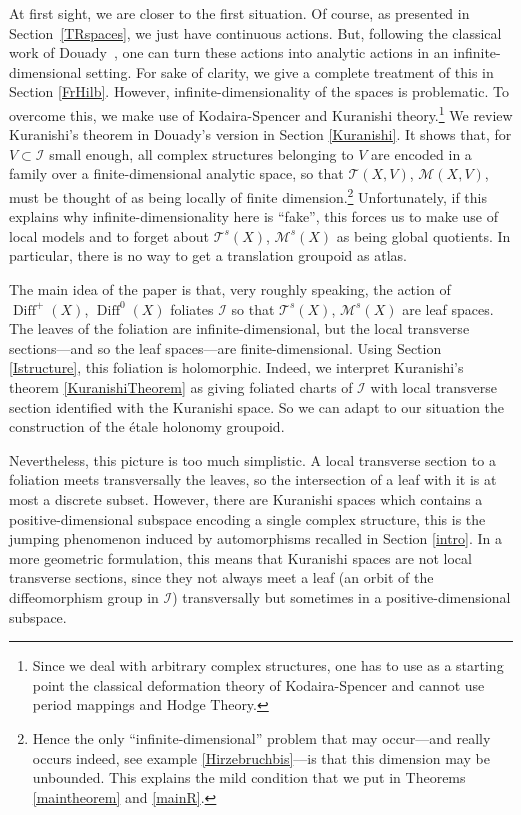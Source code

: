 \documentclass[10pt]{amsart}
\let\mathcal\mathscr
\DeclareMathOperator{\Diff}{Diff}
\theoremstyle{plain}
\theoremstyle{definition}
\theoremstyle{remark}
\numberwithin{equation}{section}
\newcommand{\cI}{\mathcal{I}}
\begin{document}
At first sight, we are closer to the first situation. Of course, as presented in Section~\ref{TRspaces}, we just have continuous actions. But, following the classical work of Douady~\cite{Douady}, one can turn these actions into analytic actions in an infinite-dimensional setting. For sake of clarity, we give a complete treatment of this in Section \ref{FrHilb}. However, infinite-dimensionality of the spaces is problematic. To overcome this, we make use of Kodaira-Spencer and Kuranishi theory.\footnote{Since we deal with arbitrary complex structures, one has to use as a starting point the classical deformation theory of Kodaira-Spencer and cannot use period mappings and Hodge Theory.} We review Kuranishi's theorem in Douady's version in Section \ref{Kuranishi}. It shows that, for $V\subset \cI$ small enough, all complex structures belonging to $V$ are encoded in a family over a finite-dimensional analytic space, so that $\mathcal T(X,V)$, \resp $\mathcal M(X,V)$, must be thought of as being locally of finite dimension.\footnote{\label{noteinfdim}Hence the only ``infinite-dimensional'' problem that may occur---and really occurs indeed, see example \ref{Hirzebruchbis}---is that this dimension may be unbounded. This explains the mild condition that we put in Theorems \ref{maintheorem} and \ref{mainR}.} Unfortunately, if this explains why infinite-dimensionality here is ``fake'', this forces us to make use of local models and to forget about $\mathcal T^s(X)$, \resp $\mathcal M^s(X)$ as being global quotients. In particular, there is no way to get a translation groupoid as atlas.

The main idea of the paper is that, very roughly speaking, the action of $\Diff^+(X)$, \resp $\Diff^0(X)$ foliates $\cI$ so that $\mathcal T^s(X)$, \resp $\mathcal M^s(X)$ are leaf spaces. The leaves of the foliation are infinite-dimensional, but the local transverse sections---and so the leaf spaces---are finite-dimensional. Using Section \ref{Istructure}, this foliation is holomorphic. Indeed, we interpret Kuranishi's theorem \ref{KuranishiTheorem} as giving foliated charts of $\cI$ with local transverse section identified with the Kuranishi space. So we can adapt to our situation the construction of the étale holonomy groupoid.

Nevertheless, this picture is too much simplistic. A local transverse section to a foliation meets transversally the leaves, so the intersection of a leaf with it is at most a discrete subset. However, there are Kuranishi spaces which contains a positive-dimensional subspace encoding a single complex structure, this is the jumping phenomenon induced by automorphisms recalled in Section \ref{intro}. In a more geometric formulation, this means that Kuranishi spaces are not local transverse sections, since they not always meet a leaf (\ie an orbit of the diffeomorphism group in $\cI$) transversally but sometimes in a positive-dimensional subspace.
\end{document}
